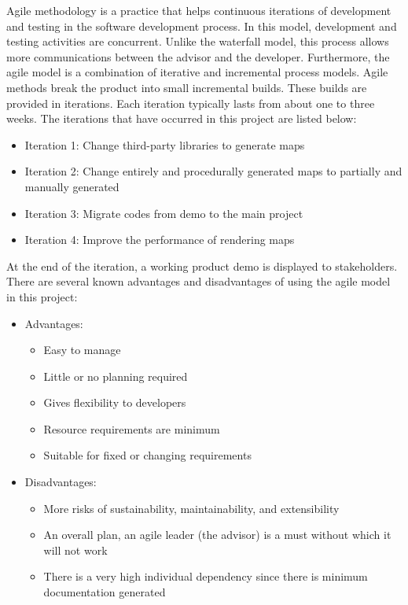 Agile methodology is a practice that helps continuous iterations of development and testing in the software development process. In this model, development and testing activities are concurrent. Unlike the waterfall model, this process allows more communications between the advisor and the developer. Furthermore, the agile model is a combination of iterative and incremental process models. Agile methods break the product into small incremental builds. These builds are provided in iterations. Each iteration typically lasts from about one to three weeks. The iterations that have occurred in
this project are listed below:
\begin{itemize}
  \item Iteration 1: Change third-party libraries to generate maps
  \item Iteration 2: Change entirely and procedurally generated maps to partially and manually generated
  \item Iteration 3: Migrate codes from demo to the main project
  \item Iteration 4: Improve the performance of rendering maps
\end{itemize}
At the end of the iteration, a working product demo is displayed to stakeholders. There are several known advantages and disadvantages of using the agile model in this project:
\begin{itemize}

  \item Advantages:
  \begin{itemize}
    \item Easy to manage
    \item Little or no planning required
    \item Gives flexibility to developers
    \item Resource requirements are minimum
    \item Suitable for fixed or changing requirements
  \end{itemize}

  \item Disadvantages:
  \begin{itemize}
    \item More risks of sustainability, maintainability, and extensibility
    \item An overall plan, an agile leader (the advisor) is a must without which it will not work
    \item There is a very high individual dependency since there is minimum documentation generated
  \end{itemize}

\end{itemize}
